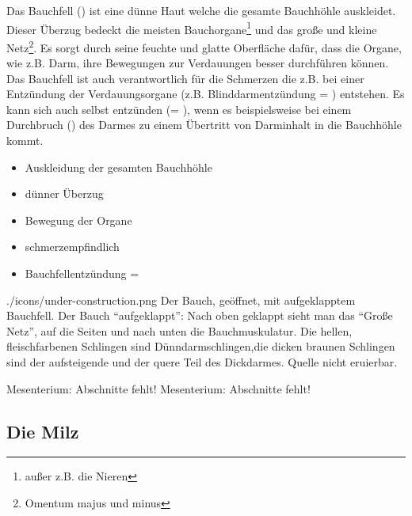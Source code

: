{}
{ 
Das Bauchfell () ist eine dünne Haut welche die gesamte
Bauchhöhle auskleidet. Dieser Überzug bedeckt die meisten
Bauchorgane\footnote{außer z.B. die Nieren} und das große und kleine 
Netz\footnote{Omentum majus und minus}.
Es sorgt durch seine feuchte und
glatte Oberfläche dafür, dass die Organe, wie z.B. Darm, ihre Bewegungen zur Verdauungen besser durchführen können.
Das Bauchfell ist auch verantwortlich für die Schmerzen die z.B. bei einer
Entzündung der Verdauungsorgane (z.B. Blinddarmentzündung =
) entstehen. Es kann sich auch selbst entzünden
(= ), wenn es beispielsweise bei einem Durchbruch
() des Darmes zu einem Übertritt von Darminhalt in die
Bauchhöhle kommt.
}
{
\begin{itemize}
    \item Auskleidung der gesamten Bauchhöhle
    \item dünner Überzug
    \item Bewegung der Organe
    \item schmerzempfindlich
    \item Bauchfellentzündung = 
\end{itemize}
}
{./icons/under-construction.png}
{\gAuthNotesPicLegalNotOk{}{}Der Bauch, geöffnet, mit aufgeklapptem
Bauchfell. Der Bauch "`aufgeklappt"': Nach oben geklappt sieht man das
 "`Große Netz"', auf die Seiten und nach unten die Bauchmuskulatur. Die
 hellen, fleischfarbenen Schlingen sind Dünndarmschlingen,die dicken braunen
 Schlingen sind der aufsteigende und der quere Teil des Dickdarmes.}
{Quelle nicht eruierbar.}


\begin{anfxwarning}[author=GABS]{Mesenterium: Abschnitte fehlt!}
   Mesenterium: Abschnitte fehlt!
\end{anfxwarning}

\subsection{Die Milz} 

